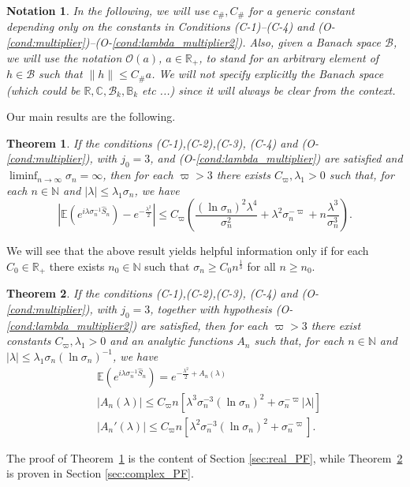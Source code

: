 \documentclass{amsart}
\numberwithin{equation}{section}
\newtheorem{thm}{Theorem}[section]
\newtheorem*{notation}{Notation}
\newcommand\cB{{\mathcal B}}
\newcommand\cO{{\mathcal O}}
\newcommand\bB{{\mathbb B}}
\newcommand\bC{{\mathbb C}}
\newcommand\bE{{\mathbb E}}
\newcommand\bN{{\mathbb N}}
\newcommand\bR{{\mathbb R}}
\newcommand{\hS}{\hat{S}}
\newcommand{\Const}{C_{\#}}
\newcommand{\const}{c_{\#}}
\begin{document}
\smallskip
\begin{notation} In the following, we will use $\const, \Const$ for a generic constant depending only on the constants in Conditions (C-1)--(C-4) and (O-\ref{cond:multiplier})--(O-\ref{cond:lambda_multiplier2}). Also, given a Banach space $\cB$, we will use the notation $\cO(a)$, $a\in\bR_+$, to stand for an arbitrary element of $h\in\cB$ such that $\|h\|\leq \Const a$. We will not specify explicitly the Banach space (which could be $\bR, \bC, \cB_k,\bB_k$ etc ...) since it will always be clear from the context.
\end{notation}
Our main results are the following.
\begin{thm}\label{thm:main}
If the conditions (C-1),(C-2),(C-3), (C-4) and (O-\ref{cond:multiplier}), with $j_0=3$, and (O-\ref{cond:lambda_multiplier}) are satisfied and $\liminf_{n\to\infty}\sigma_n=\infty$, then for each $\varpi>3$ there exists $C_\varpi, \lambda_1>0$ such that, for each $n\in\bN$ and $|\lambda|\leq \lambda_1\sigma_n$, we have
\[
\left|\bE\left(e^{i\lambda \sigma_n^{-1}  \hS_n}\right)-e^{-\frac{\lambda^2}2}\right|\leq C_\varpi\left(\frac{(\ln \sigma_n)^2\lambda^4}{\sigma_n^2}+\lambda^2 \sigma_n^{-\varpi}+n\frac{\lambda^3}{\sigma_n^3}\right).
\]
\end{thm}
We will see that the above result yields helpful information only if for each $C_0\in\bR_+$ there exists $n_0\in\bN$ such that $\sigma_n\geq C_0n^{\frac 13}$ for all $n\geq n_0$.
\begin{thm}\label{thm:main_bis}
If the conditions (C-1),(C-2),(C-3), (C-4) and (O-\ref{cond:multiplier}),  with $j_0=3$, together with hypothesis (O-\ref{cond:lambda_multiplier2}) are satisfied, then for each $\varpi>3$ there exist constants $C_\varpi, \lambda_1>0$ and an analytic functions $A_n$ such that, for each $n\in\bN$ and $
|\lambda|\leq \lambda_1\sigma_n(\ln \sigma_n)^{-1}$,
we have
\[
\begin{split}
&\bE\left(e^{i\lambda \sigma_n^{-1} \hS_n}\right)=e^{-\frac{\lambda^2}2+A_n(\lambda)}\\
&\left|A_n(\lambda)\right|\leq C_\varpi n\left[ \lambda^3\sigma_n^{-3}(\ln\sigma_n)^2 +\sigma_n^{-\varpi}|\lambda|\right]\\
&\left|A_n'(\lambda)\right|\leq  C_\varpi n\left[ \lambda^2\sigma_n^{-3}(\ln\sigma_n)^2 +\sigma_n^{-\varpi}\right].
\end{split}
\]
\end{thm}
The proof of Theorem~\ref{thm:main} is the content of Section \ref{sec:real_PF}, while 
Theorem~\ref{thm:main_bis} is proven in Section \ref{sec:complex_PF}.
\end{document}
